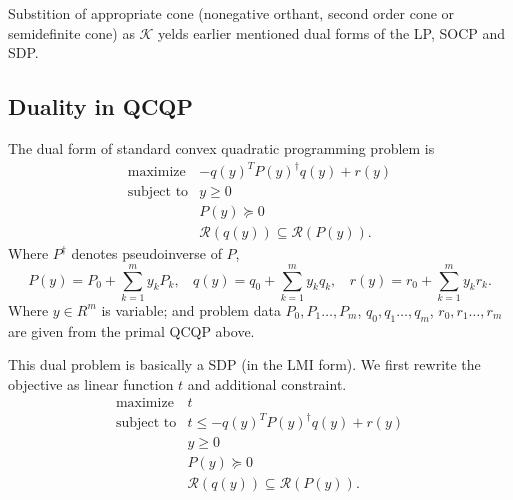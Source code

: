 \documentclass[10pt,oneside]{book}
\theoremstyle{definition}
\begin{document}
Substition of appropriate cone (nonegative orthant, second order cone or semidefinite cone) as $\mathcal{K}$ yelds earlier mentioned dual forms of the LP, SOCP and SDP.


\subsection{Duality in QCQP}



The dual form of standard convex quadratic programming problem is 
\begin{equation}
\label{QCQD} 
\begin{array}{ll}
\mbox{maximize} & -q(y)^TP(y)^{\dagger}q(y) + r(y) \\
\mbox{subject to}&  y \geq 0\\
& P(y )\succeq 0 \\
& \mathcal{R}(q(y)) \subseteq \mathcal{R}(P(y)).
\end{array} 
\tag{QCQP Dual}
\end{equation}
Where $P^\dagger$ denotes pseudoinverse of $P$, $$ P(y) = P_0 + \sum_{k = 1}^m y_kP_k, \ \ \ \  q(y) = q_0 + \sum_{k = 1}^m y_kq_k, \ \ \ \ r(y) = r_0 + \sum_{k =1}^m y_kr_k. $$
Where $y\in R^m$ is variable; and problem data $P_0,P_1\dots ,P_m$, $q_0,q_1\dots ,q_m$, $r_0,r_1\dots , r_m$ are given from the primal QCQP above.


This dual problem is basically a SDP (in the LMI form). We first rewrite the objective as linear function $t$ and additional constraint.
\begin{equation}
\begin{array}{ll}
\mbox{maximize} & t \\
\mbox{subject to}&  t\leq -q(y)^TP(y)^{\dagger}q(y) + r(y) \\
&y \geq 0\\
& P(y )\succeq 0\\
& \mathcal{R}(q(y)) \subseteq \mathcal{R}(P(y)).
\end{array} 
\end{equation}
\end{document}

